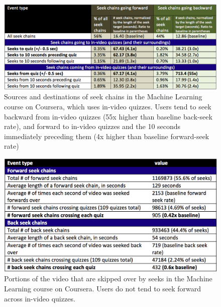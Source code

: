 \documentclass{sigchi}
\begin{document}
\begin{figure}
\includegraphics[width=1.0\columnwidth]{seek-sources-and-destinations-short}
\caption{Sources and destinations of seek chains in the Machine Learning course on Coursera, which uses in-video quizzes. Users tend to seek backward from in-video quizzes (55x higher than baseline back-seek rate), and forward to in-video quizzes and the 10 seconds immediately preceding them (4x higher than baseline forward-seek rate)}
\label{fig:seek-sources-and-destinations-short}
\end{figure}

\begin{figure}
\includegraphics[width=1.0\columnwidth]{table-of-seeks-short}
\caption{Portions of the video that are skipped over by seeks in the Machine Learning course on Coursera. Users do not tend to seek forward across in-video quizzes.}
\label{fig:table-of-seeks-short}
\end{figure}
\end{document}
